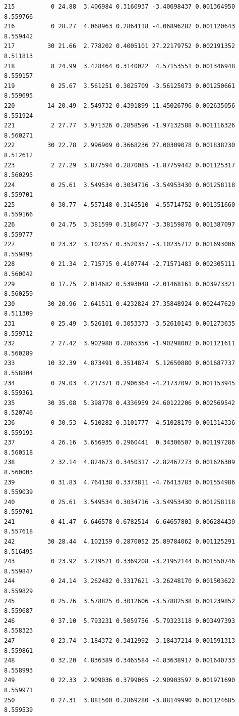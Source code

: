 \documentclass[]{book}
\theoremstyle{definition}
\theoremstyle{definition}
\theoremstyle{definition}
\theoremstyle{remark}
\begin{document}
\begin{verbatim}
215          0 24.88  3.406984 0.3160937 -3.40698437 0.001364950 8.559766
216          0 28.27  4.068963 0.2864118 -4.06896282 0.001120643 8.559442
217         30 21.66  2.778202 0.4005101 27.22179752 0.002191352 8.511813
218          8 24.99  3.428464 0.3140022  4.57153551 0.001346948 8.559157
219          0 25.67  3.561251 0.3025709 -3.56125073 0.001250661 8.559695
220         14 20.49  2.549732 0.4391899 11.45026796 0.002635056 8.551924
221          2 27.77  3.971326 0.2858596 -1.97132588 0.001116326 8.560271
222         30 22.78  2.996909 0.3668236 27.00309078 0.001838230 8.512612
223          2 27.29  3.877594 0.2870085 -1.87759442 0.001125317 8.560295
224          0 25.61  3.549534 0.3034716 -3.54953430 0.001258118 8.559701
225          0 30.77  4.557148 0.3145510 -4.55714752 0.001351660 8.559166
226          0 24.75  3.381599 0.3186477 -3.38159876 0.001387097 8.559777
227          0 23.32  3.102357 0.3520357 -3.10235712 0.001693006 8.559895
228          0 21.34  2.715715 0.4107744 -2.71571483 0.002305111 8.560042
229          0 17.75  2.014682 0.5393048 -2.01468161 0.003973321 8.560259
230         30 20.96  2.641511 0.4232824 27.35848924 0.002447629 8.511309
231          0 25.49  3.526101 0.3053373 -3.52610143 0.001273635 8.559712
232          2 27.42  3.902980 0.2865356 -1.90298002 0.001121611 8.560289
233         10 32.39  4.873491 0.3514874  5.12650880 0.001687737 8.558804
234          0 29.03  4.217371 0.2906364 -4.21737097 0.001153945 8.559361
235         30 35.08  5.398778 0.4336959 24.60122206 0.002569542 8.520746
236          0 30.53  4.510282 0.3101777 -4.51028179 0.001314336 8.559193
237          4 26.16  3.656935 0.2960441  0.34306507 0.001197286 8.560518
238          2 32.14  4.824673 0.3450317 -2.82467273 0.001626309 8.560003
239          0 31.83  4.764138 0.3373811 -4.76413783 0.001554986 8.559039
240          0 25.61  3.549534 0.3034716 -3.54953430 0.001258118 8.559701
241          0 41.47  6.646578 0.6782514 -6.64657803 0.006284439 8.557618
242         30 28.44  4.102159 0.2870052 25.89784062 0.001125291 8.516495
243          0 23.92  3.219521 0.3369208 -3.21952144 0.001550746 8.559847
244          0 24.14  3.262482 0.3317621 -3.26248170 0.001503622 8.559829
245          0 25.76  3.578825 0.3012606 -3.57882538 0.001239852 8.559687
246          0 37.10  5.793231 0.5059756 -5.79323118 0.003497393 8.558323
247          0 23.74  3.184372 0.3412992 -3.18437214 0.001591313 8.559861
248          0 32.20  4.836389 0.3465584 -4.83638917 0.001640733 8.558993
249          0 22.33  2.909036 0.3799065 -2.90903597 0.001971690 8.559971
250          0 27.31  3.881500 0.2869280 -3.88149990 0.001124685 8.559539

\end{verbatim}
\end{document}
